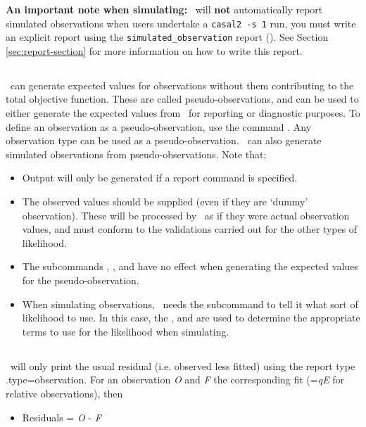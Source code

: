 \textbf{An important note when simulating:} \CNAME\ will \textbf{not} automatically report simulated observations when users undertake a \texttt{casal2 -s 1} run, you must write an explicit report using the \texttt{simulated\_observation} report (). See Section \ref{sec:report-section} for more information on how to write this report.


\subsection{}
\CNAME\ can generate expected values for observations without them contributing to the total objective function. These are called pseudo-observations, and can be used to either generate the expected values from \CNAME\ for reporting or diagnostic purposes. To define an observation as a pseudo-observation, use the command . Any observation type can be used as a pseudo-observation. \CNAME\ can also generate simulated observations from pseudo-observations. Note that;

\begin{itemize}
  \item Output will only be generated if a report command  is specified.
  \item The observed values should be supplied (even if they are `dummy' observation). These will be processed by \CNAME\ as if they were actual observation values, and must conform to the validations carried out for the other types of likelihood. 
  \item The subcommands , ,  and  have no effect when generating the expected values for the pseudo-observation.   
  \item When simulating observations, \CNAME\ needs the subcommand  to tell it what sort of likelihood to use. In this case, the ,  and  are used to determine the appropriate terms to use for the likelihood when simulating.
\end{itemize}

\subsection{}\label{sec:Residuals}
\CNAME\ will only print the usual residual (i.e. observed less fitted) using the report type .type=observation. For an observation \textit{O} and \textit{F} the corresponding fit (=\textit{qE} for relative observations), then
\begin{itemize}
	\item Residuals = \textit{O} - \textit{F}
\end{itemize}

